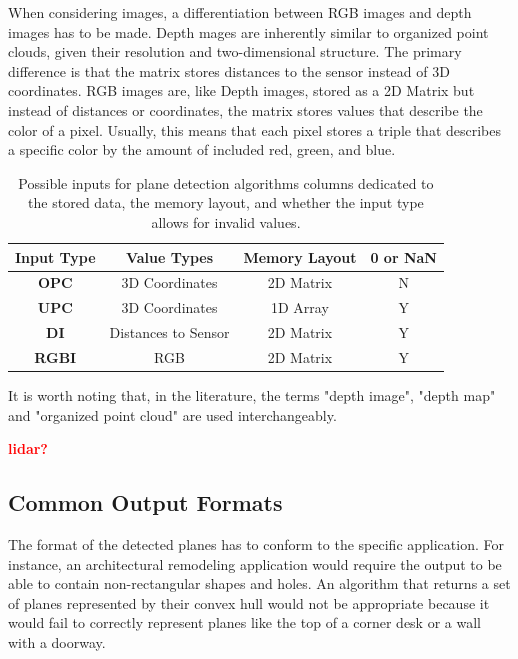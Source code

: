 \documentclass[main.tex]{subfiles}
\begin{document}
When considering images, a differentiation between RGB images and depth images has to be made.
Depth mages are inherently similar to organized point clouds, given their resolution and two-dimensional structure.
The primary difference is that the matrix stores distances to the sensor instead of 3D coordinates.
RGB images are, like Depth images, stored as a 2D Matrix but instead of distances or coordinates, the matrix stores
values that describe the color of a pixel. Usually, this means that each pixel stores a triple that describes a specific
color by the amount of included red, green, and blue.

\begin{table}[H]
    \centering
    \begin{tabular}{c|c|c|c}
        \textbf{Input Type} & \textbf{Value Types} & \textbf{Memory Layout} & \textbf{0 or NaN} \\ \hline
        \textbf{OPC}        & 3D Coordinates       & 2D Matrix              & N                 \\
        \textbf{UPC}        & 3D Coordinates       & 1D Array               & Y                 \\
        \textbf{DI}         & Distances to Sensor  & 2D Matrix              & Y                 \\
        \textbf{RGBI}       & RGB                  & 2D Matrix              & Y
    \end{tabular}
    \caption{Possible inputs for plane detection algorithms columns dedicated to the stored data, the memory layout, and whether
        the input type allows for invalid values.}
    \label{tab:inputs}
\end{table}
It is worth noting that, in the literature, the terms "depth image", "depth map" and "organized point cloud" are used interchangeably.

\textbf{\textcolor{red}{lidar?}}

\subsection{Common Output Formats}
\label{subsec:output}
The format of the detected planes has to conform to the specific application. For instance, an architectural remodeling application
would require the output to be able to contain non-rectangular shapes and holes.
An algorithm that returns a set of planes represented by their convex hull would not be appropriate because it
would fail to correctly represent planes like the top of a corner desk or a wall with a doorway.
\end{document}
